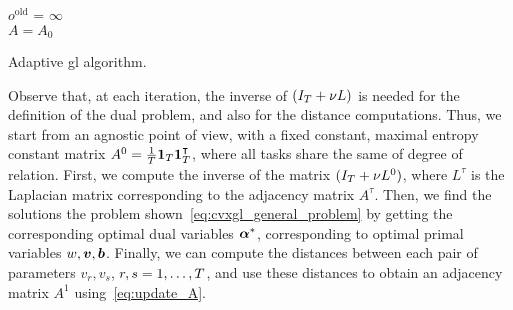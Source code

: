 \begin{algorithm}[!t]
    \DontPrintSemicolon
      
    $o^\text{old}$ = $\infty$ \\
    $A = A_0$ 
    \caption{Adaptive \acrshort{gl} algorithm.}
    \label{alg:adapgl}
\end{algorithm}



%
Observe that, at each iteration, the inverse of $(I_T + \nu L)$ is needed for the definition of the dual problem, and also for the distance computations.
Thus, we start from an agnostic point of view, with a fixed constant, maximal entropy constant matrix $A^0 = \frac{1}{T} \bm{1}_T \bm{1}_T^\intercal$, where all tasks share the same of degree of relation.
First, we compute the inverse of the matrix $(I_T + \nu L^0)$, where $L^\tau$ is the Laplacian matrix corresponding to the adjacency matrix $A^\tau$.
Then, we find the solutions the problem shown~\eqref{eq:cvxgl_general_problem} by getting the corresponding optimal dual variables $\bm{\alpha}^*$, corresponding to optimal primal variables $w, \bm{v}, \bm{b}$. 
Finally, we can compute the distances between each pair of parameters $v_r, v_s$, $r, s=1, \ldots, T$, and use these distances to obtain an adjacency matrix $A^1$ using~\eqref{eq:update_A}. 

